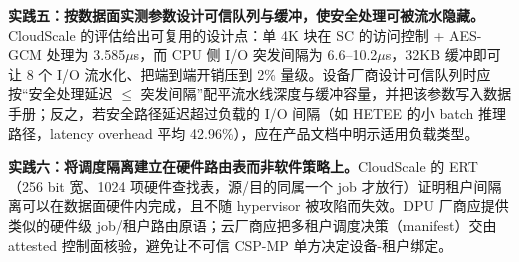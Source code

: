\documentclass[11pt]{ctexart}
\begin{document}
\noindent\textbf{实践五：按数据面实测参数设计可信队列与缓冲，使安全处理可被流水隐藏。}CloudScale 的评估给出可复用的设计点：单 4K 块在 SC 的访问控制 + AES-GCM 处理为 3.585$\mu$s，而 CPU 侧 I/O 突发间隔为 6.6--10.2$\mu$s，32KB 缓冲即可让 8 个 I/O 流水化、把端到端开销压到 2\% 量级\cite{dhar2024cloudscale}。设备厂商设计可信队列时应按``安全处理延迟 $\le$ 突发间隔''配平流水线深度与缓冲容量，并把该参数写入数据手册；反之，若安全路径延迟超过负载的 I/O 间隔（如 HETEE 的小 batch 推理路径，latency overhead 平均 42.96\%\cite{zhu2020hetee}），应在产品文档中明示适用负载类型。\par
\noindent\textbf{实践六：将调度隔离建立在硬件路由表而非软件策略上。}CloudScale 的 ERT（256 bit 宽、1024 项硬件查找表，源/目的同属一个 job 才放行）证明租户间隔离可以在数据面硬件内完成，且不随 hypervisor 被攻陷而失效\cite{dhar2024cloudscale}。DPU 厂商应提供类似的硬件级 job/租户路由原语；云厂商应把多租户调度决策（manifest）交由 attested 控制面核验，避免让不可信 CSP-MP 单方决定设备-租户绑定。\par
\end{document}
